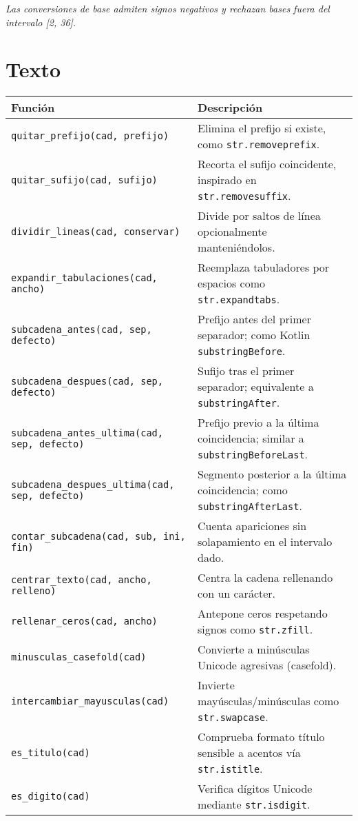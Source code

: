 \documentclass{article}
\begin{document}
\textit{Las conversiones de base admiten signos negativos y rechazan bases fuera del intervalo [2, 36].}

\section*{Texto}
\begin{tabular}{ll}
\textbf{Función} & \textbf{Descripción}\\\hline
\texttt{quitar\_prefijo(cad, prefijo)} & Elimina el prefijo si existe, como \texttt{str.removeprefix}.\\
\texttt{quitar\_sufijo(cad, sufijo)} & Recorta el sufijo coincidente, inspirado en \texttt{str.removesuffix}.\\
\texttt{dividir\_lineas(cad, conservar)} & Divide por saltos de línea opcionalmente manteniéndolos.\\
\texttt{expandir\_tabulaciones(cad, ancho)} & Reemplaza tabuladores por espacios como \texttt{str.expandtabs}.\\
\texttt{subcadena\_antes(cad, sep, defecto)} & Prefijo antes del primer separador; como Kotlin \texttt{substringBefore}.\\
\texttt{subcadena\_despues(cad, sep, defecto)} & Sufijo tras el primer separador; equivalente a \texttt{substringAfter}.\\
\texttt{subcadena\_antes\_ultima(cad, sep, defecto)} & Prefijo previo a la última coincidencia; similar a \texttt{substringBeforeLast}.\\
\texttt{subcadena\_despues\_ultima(cad, sep, defecto)} & Segmento posterior a la última coincidencia; como \texttt{substringAfterLast}.\\
\texttt{contar\_subcadena(cad, sub, ini, fin)} & Cuenta apariciones sin solapamiento en el intervalo dado.\\
\texttt{centrar\_texto(cad, ancho, relleno)} & Centra la cadena rellenando con un carácter.\\
\texttt{rellenar\_ceros(cad, ancho)} & Antepone ceros respetando signos como \texttt{str.zfill}.\\
\texttt{minusculas\_casefold(cad)} & Convierte a minúsculas Unicode agresivas (casefold).\\
\texttt{intercambiar\_mayusculas(cad)} & Invierte mayúsculas/minúsculas como \texttt{str.swapcase}.\\
\texttt{es\_titulo(cad)} & Comprueba formato título sensible a acentos vía \texttt{str.istitle}.\\
\texttt{es\_digito(cad)} & Verifica dígitos Unicode mediante \texttt{str.isdigit}.\\
\end{tabular}
\end{document}
